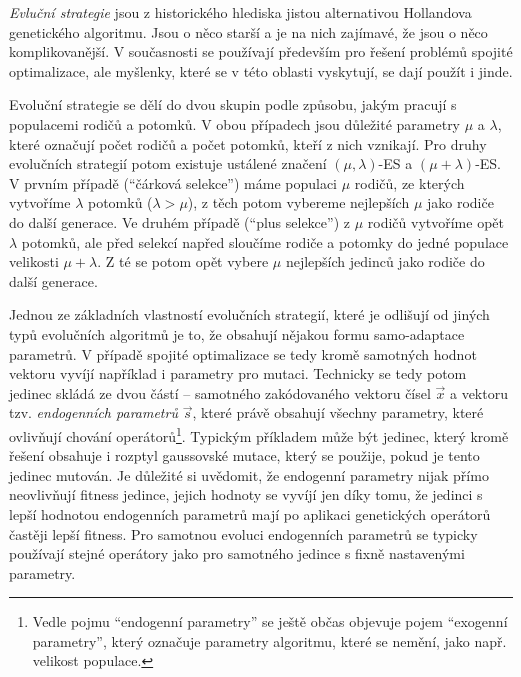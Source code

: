 
\emph{Evluční strategie}\cite{rechenberg1973,schwefel1977numerische} jsou z historického hlediska jistou alternativou Hollandova genetického algoritmu. Jsou o něco starší a je na nich zajímavé, že jsou o něco komplikovanější. V současnosti se používají především pro řešení problémů spojité optimalizace, ale myšlenky, které se v této oblasti vyskytují, se dají použít i jinde.

Evoluční strategie se dělí do dvou skupin podle způsobu, jakým pracují s populacemi rodičů a potomků. V obou případech jsou důležité parametry $\mu$ a $\lambda$, které označují počet rodičů a počet potomků, kteří z nich vznikají. Pro druhy evolučních strategií potom existuje ustálené značení $(\mu, \lambda)$-ES a $(\mu + \lambda)$-ES. V prvním případě (``čárková selekce'') máme populaci $\mu$ rodičů, ze kterých vytvoříme $\lambda$ potomků ($\lambda > \mu$), z těch potom vybereme nejlepších $\mu$ jako rodiče do další generace.  Ve druhém případě (``plus selekce'') z $\mu$ rodičů vytvoříme opět $\lambda$ potomků, ale před selekcí napřed sloučíme rodiče a potomky do jedné populace velikosti $\mu + \lambda$. Z té se potom opět vybere $\mu$ nejlepších jedinců jako rodiče do další generace. 

Jednou ze základních vlastností evolučních strategií, které je odlišují od jiných typů evolučních algoritmů je to, že obsahují nějakou formu samo-adaptace parametrů. V případě spojité optimalizace se tedy kromě samotných hodnot vektoru vyvíjí například i parametry pro mutaci. Technicky se tedy potom jedinec skládá ze dvou částí -- samotného zakódovaného vektoru čísel $\vec{x}$ a vektoru tzv. \emph{endogenních parametrů} $\vec{s}$, které právě obsahují všechny parametry, které ovlivňují chování operátorů\footnote{Vedle pojmu ``endogenní parametry'' se ještě občas objevuje pojem ``exogenní parametry'', který označuje parametry algoritmu, které se nemění, jako např. velikost populace.}. Typickým příkladem může být jedinec, který kromě řešení obsahuje i rozptyl gaussovské mutace, který se použije, pokud je tento jedinec mutován. Je důležité si uvědomit, že endogenní parametry nijak přímo neovlivňují fitness jedince, jejich hodnoty se vyvíjí jen díky tomu, že jedinci s lepší hodnotou endogenních parametrů mají po aplikaci genetických operátorů častěji lepší fitness. Pro samotnou evoluci endogenních parametrů se typicky používají stejné operátory jako pro samotného jedince s fixně nastavenými parametry.